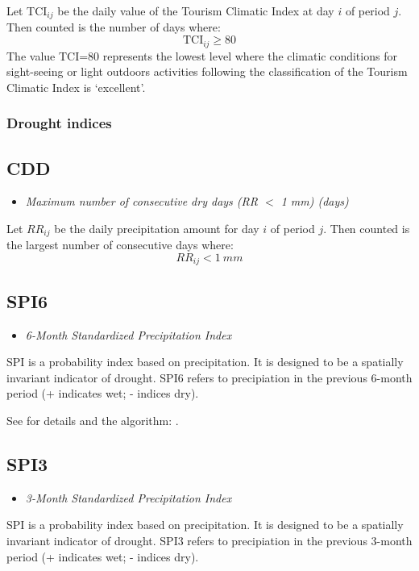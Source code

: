 \documentclass[a4paper,11pt]{article}
\begin{document}
Let TCI$_{ij}$ be the daily value of the Tourism Climatic Index at day $i$ of period $j$.
Then counted is the number of days where:
\begin{equation*}
\text{TCI}_{ij} \ge 80
\end{equation*}
The value TCI=80 represents the lowest level where the climatic conditions for sight-seeing or light outdoors
activities following the classification of the Tourism Climatic Index is `excellent'.

\subsubsection{Drought indices}

\subsection*{CDD}
\begin{itemize}
\item \textit{Maximum number of consecutive dry days (RR $<$ 1 mm) (days)}
\end{itemize}
Let $RR_{ij}$ be the daily precipitation amount for day $i$ of period
$j$. Then counted is the largest number of consecutive days where:
\begin{equation*}
RR_{ij} < 1~mm
\end{equation*}

\subsection*{SPI6}
\begin{itemize}
\item \textit{6-Month Standardized Precipitation Index}
\end{itemize}
SPI is a probability index based on precipitation. It is designed to
be a spatially invariant indicator of drought. SPI6 refers to
precipiation in the previous 6-month period (+ indicates wet; -
indices dry).

See for details and the algorithm: \citet{guttman:99}.

\subsection*{SPI3}
\begin{itemize}
\item \textit{3-Month Standardized Precipitation Index}
\end{itemize}
SPI is a probability index based on precipitation. It is designed to
be a spatially invariant indicator of drought. SPI3 refers to
precipiation in the previous 3-month period (+ indicates wet; -
indices dry).
\end{document}
